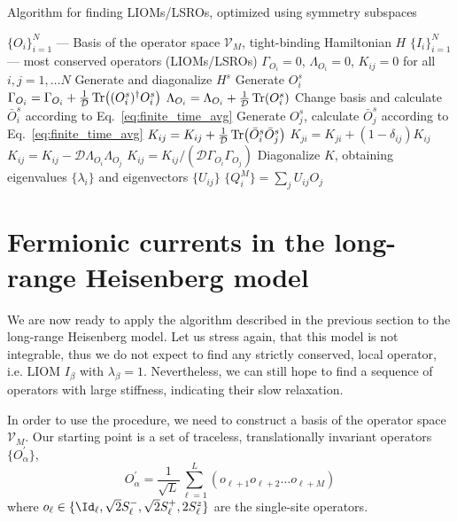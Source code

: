 \begin{algorithm}
	\algrenewcommand{}
	\algrenewcommand{}
	\caption{Algorithm for finding LIOMs/LSROs, optimized using symmetry subspaces}
	\label{alg:liom_alg}
	\begin{algorithmic}[1]
	\Require  \(\{O_i\}_{i=1}^N\) --- Basis of the operator space \(\mathcal{V}_M\), tight-binding Hamiltonian \(H\)
	\Ensure \(\{I_i\}_{i=1}^N\) --- most conserved operators (LIOMs/LSROs)
    \State \(\Gamma_{O_i} = 0\), \(\Lambda_{O_i} = 0\), \(K_{ij} = 0\) for all \(i,j = 1,\ldots N\)
      \State Generate and diagonalize \(H^s\)
        \State Generate \(O_i^s\)
        \State \(\Gamma_{O_i} = \Gamma_{O_i} + \frac{1}{\mathcal{D}}\Tr((O_i^s)^{\dag}O_i^s)\)
        \State \(\Lambda_{O_i} = \Lambda_{O_i} + \frac{1}{\mathcal{D}}\Tr(O_i^s)\)
        \State Change basis and calculate \(\bar{O}_i^s\) according to Eq.~\eqref{eq:finite_time_avg}
          \State Generate \(O_j^s\), calculate \(\bar{O}_j^s\) according to Eq.~\eqref{eq:finite_time_avg}
          \State \(K_{ij} = K_{ij} + \frac{1}{\mathcal{D}}\Tr(\bar{O}_i^s \bar{O}_j^s)\)
          \State \(K_{ji} = K_{ji} + (1 - \delta_{ij}) K_{ij}\)
        \EndFor
      \EndFor
    \EndFor
      \State \(K_{ij} = K_{ij} - \mathcal{D} \Lambda_{O_i} \Lambda_{O_j}\)
      \State \(K_{ij} = K_{ij}/(\mathcal{D} \Gamma_{O_i} \Gamma_{O_j})\)
    \EndFor
    \State Diagonalize \(K\), obtaining eigenvalues \(\{\lambda_i\}\) and eigenvectors \(\{U_{ij}\}\)
    \State \(\{Q_i^M\} = \sum_j U_{ij} O_j\)
  \end{algorithmic}
\end{algorithm}

\newpage
\section{Fermionic currents in the long-range Heisenberg model \label{sec:fermionic_currents}}

We are now ready to apply the algorithm described in the previous section to the long-range Heisenberg model.
Let us stress again, that this model is not integrable, thus we do not expect to find any
strictly conserved, local operator, i.e. LIOM \(I_{\beta}\) with \(\lambda_{\beta} = 1\).
Nevertheless, we can still hope to find a sequence of operators with large stiffness,
indicating their slow relaxation.

In order to use the procedure, we need to construct a basis of the operator space \(\mathcal{V}_M\).
Our starting point is a set of traceless, translationally invariant operators \(\{O^{\prime}_{\alpha}\}\),
\begin{equation}
  O^{\prime}_{\alpha} = \frac{1}{\sqrt{L}}\sum_{\ell=1}^L\left( o_{\ell+1}o_{\ell+2}\ldots o_{\ell+M} \right)
  \label{eq:operator_basis}
\end{equation}
where \(o_{\ell} \in \{\Id_{\ell}, \sqrt{2}\Sm_{\ell},\sqrt{2}\Sp_{\ell},2\Sz_{\ell}\}\) are the single-site operators.